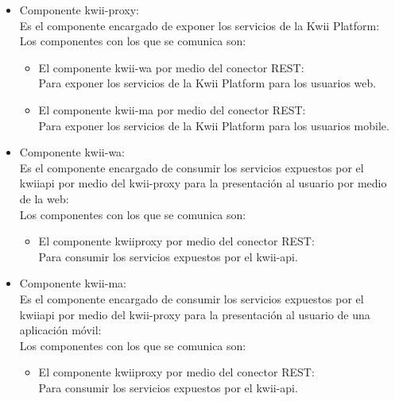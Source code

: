 \begin{itemize}
    Es el componente que almacena la información relacionada con las notificaiones en el sistema.
    Los componentes con los que se comunica son:
    \begin{itemize}
        \item El componente Notification-ms por medio del conector go\textunderscore redis:\\
        El componente Notification-ms utilizará Notification-db para almacenar la infomación relacionada con las notificaciones.
    \end{itemize}
    \item Componente kwii-proxy:\\
    Es el componente encargado de exponer los servicios de la Kwii Platform:\\
    Los componentes con los que se comunica son:
    \begin{itemize}
        \item El componente kwii-wa por medio del conector REST:\\
        Para exponer los servicios de la Kwii Platform para los usuarios web.
        \item El componente kwii-ma por medio del conector REST:\\
        Para exponer los servicios de la Kwii Platform para los usuarios mobile.
    \end{itemize}
    \item Componente kwii-wa:\\
    Es el componente encargado de consumir los servicios expuestos por el kwii\textunderscore api por medio del kwii-proxy para la presentación al usuario por medio de la web:\\
    Los componentes con los que se comunica son:
    \begin{itemize}
        \item El componente kwii\textunderscore proxy por medio del conector REST:\\
        Para consumir los servicios expuestos por el kwii-api.
    \end{itemize}
    \item Componente kwii-ma:\\
    Es el componente encargado de consumir los servicios expuestos por el kwii\textunderscore api por medio del kwii-proxy para la presentación al usuario de una aplicación móvil:\\
    Los componentes con los que se comunica son:
    \begin{itemize}
        \item El componente kwii\textunderscore proxy por medio del conector REST:\\
        Para consumir los servicios expuestos por el kwii-api.
    \end{itemize}
\end{itemize}

